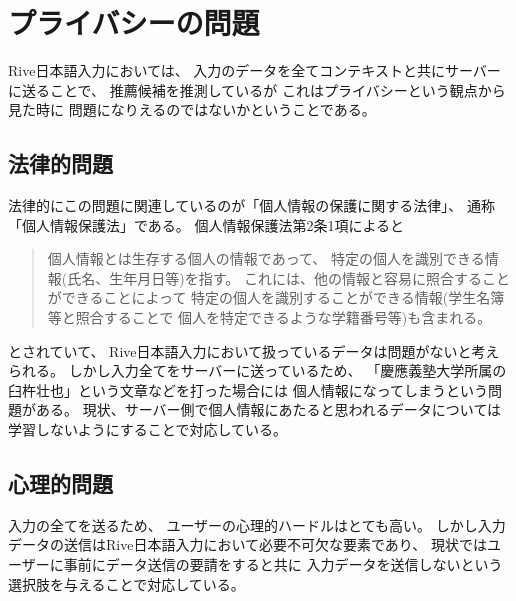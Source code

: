 \section{プライバシーの問題}
Rive日本語入力においては、
入力のデータを全てコンテキストと共にサーバーに送ることで、
推薦候補を推測しているが
これはプライバシーという観点から見た時に
問題になりえるのではないかということである。

\subsection{法律的問題}
法律的にこの問題に関連しているのが「個人情報の保護に関する法律」、
通称「個人情報保護法」である。
個人情報保護法第2条1項によると
\begin{quotation}
  個人情報とは生存する個人の情報であって、
  特定の個人を識別できる情報(氏名、生年月日等)を指す。
  これには、他の情報と容易に照合することができることによって
  特定の個人を識別することができる情報(学生名簿等と照合することで
  個人を特定できるような学籍番号等)も含まれる。
\end{quotation}
とされていて、
Rive日本語入力において扱っているデータは問題がないと考えられる。
しかし入力全てをサーバーに送っているため、
「慶應義塾大学所属の臼杵壮也」という文章などを打った場合には
個人情報になってしまうという問題がある。
現状、サーバー側で個人情報にあたると思われるデータについては
学習しないようにすることで対応している。

\subsection{心理的問題}
入力の全てを送るため、
ユーザーの心理的ハードルはとても高い。
しかし入力データの送信はRive日本語入力において必要不可欠な要素であり、
現状ではユーザーに事前にデータ送信の要請をすると共に
入力データを送信しないという選択肢を与えることで対応している。

